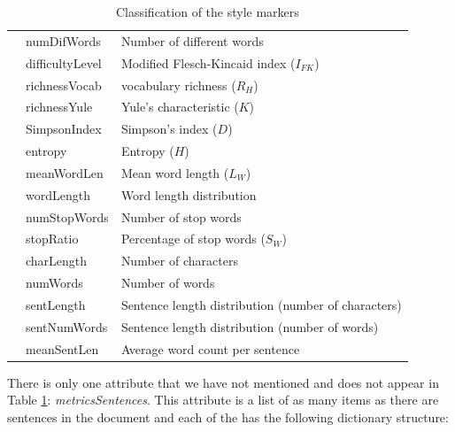 \begin{table}[h]
\begin{tabular}{|l|ll|}
		& numDifWords                    & Number of different words                           \\ \cline{2-3} 
		& difficultyLevel                & Modified Flesch-Kincaid index ($I_{FK}$)                       \\ \cline{2-3} 
		& richnessVocab                  & \cite{honore1979some} vocabulary richness ($R_H$)                                     \\ \cline{2-3} 
		& richnessYule                   & Yule's characteristic ($K$)                               \\ \cline{2-3} 
		& SimpsonIndex                   & Simpson's index ($D$)                                     \\ \cline{2-3} 
		& entropy                        & Entropy ($H$)                                             \\ \cline{2-3} 
		& meanWordLen                    & Mean word length ($L_W$)                                    \\ \cline{2-3} 
		& wordLength                     & Word length distribution                            \\ \cline{2-3} 
		& numStopWords                   & Number of stop words                                \\ \cline{2-3} 
		& stopRatio                      & Percentage of stop words ($S_W$)                            \\ \hhline{|=|=|=|}
		\multirow{5}{*}{Structural}            & charLength                     & Number of characters                                \\ \cline{2-3} 
		& numWords                       & Number of words                                     \\ \cline{2-3} 
		& sentLength                     & Sentence length distribution (number of characters) \\ \cline{2-3} 
		& sentNumWords                   & Sentence length distribution (number of words)      \\ \cline{2-3} 
		& meanSentLen                    & Average word count per sentence                     \\ \hline
	\end{tabular}
\caption{Classification of the style markers}\label{tab:sty}
\end{table}

There is only one attribute that we have not mentioned and does not appear in Table \ref{tab:sty}: \textit{metricsSentences}. This attribute is a list of as many items as there are sentences in the document and each of the has the following dictionary structure:

